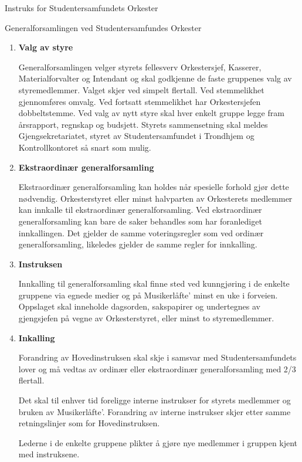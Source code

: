 \begin{instruks}{Instruks for Studentersamfundets Orkester}{ }{ }
\begin{instruksledd}{Generalforsamlingen ved Studentersamfundes Orkester}
\begin{enumerate}
            \item \textbf{Valg av styre}

                Generalforsamlingen velger styrets fellesverv Orkestersjef, Kasserer, Materialforvalter og Intendant
                og skal
                godkjenne de faste gruppenes valg av styremedlemmer. Valget skjer ved simpelt flertall. Ved
                stemmelikhet
                gjennomføres omvalg. Ved fortsatt stemmelikhet har Orkestersjefen dobbeltstemme. Ved valg av nytt
                styre
                skal hver enkelt gruppe legge fram årsrapport, regnskap og budsjett. Styrets sammensetning skal
                meldes
                Gjengsekretariatet, styret av Studentersamfundet i Trondhjem og Kontrollkontoret så snart som mulig.

            \item \textbf{Ekstraordinær generalforsamling}

                Ekstraordinær generalforsamling kan holdes når spesielle forhold gjør dette nødvendig.
                Orkesterstyret eller
                minst halvparten av Orkesterets medlemmer kan innkalle til ekstraordinær generalforsamling. Ved
                ekstraordinær generalforsamling kan bare de saker behandles som har foranlediget innkallingen. Det
                gjelder
                de samme voteringsregler som ved ordinær generalforsamling, likeledes gjelder de samme regler for
                innkalling.

            \item \textbf{Instruksen}

                Innkalling til generalforsamling skal finne sted ved kunngjøring i de enkelte gruppene via
                egnede medier og
                på Musikerlåfte' minst en uke i forveien. Oppslaget skal inneholde dagsorden, sakspapirer og
                undertegnes av
                gjengsjefen på vegne av Orkesterstyret, eller minst to styremedlemmer.
            \item \textbf{Inkalling}

                Forandring av Hovedinstruksen skal skje i samsvar med Studentersamfundets lover og må vedtas av
                ordinær
                eller ekstraordinær generalforsamling med 2/3 flertall.

                Det skal til enhver tid foreligge interne instrukser for styrets medlemmer og bruken av
                Musikerlåfte'.
                Forandring av interne instrukser skjer etter samme retningslinjer som for Hovedinstruksen.

                Lederne i de enkelte gruppene plikter å gjøre nye medlemmer i gruppen kjent med instruksene.

        \end{enumerate}
    \end{instruksledd}

\end{instruks}


